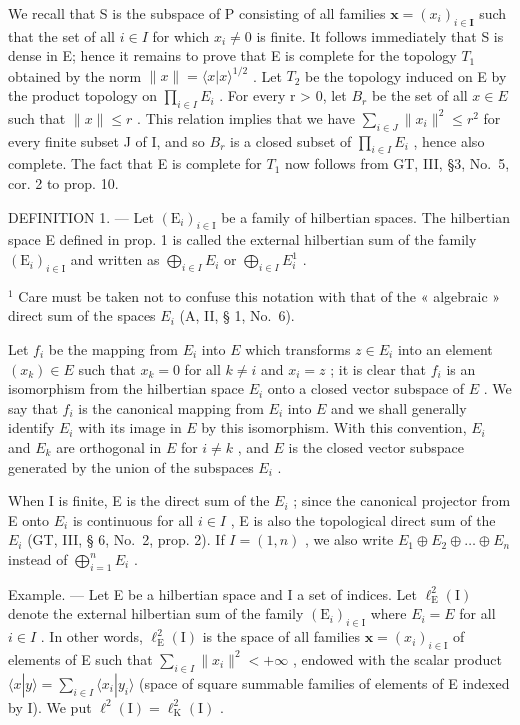 We recall that S is the subspace of P consisting of all families \(\mathbf{x} = (x_{i})_{i \in \mathbf{I}}\) such that the set of all \(i \in I\) for which \(x_{i} \neq 0\) is finite. It follows immediately that S is dense in E; hence it remains to prove that E is complete for the topology \(T_{1}\) obtained by the norm \(\|x\| = \langle x|x\rangle^{1/2}\) . Let \(T_{2}\) be the topology induced on E by the product topology on \(\prod_{i \in I} E_{i}\) . For every r \textgreater{} 0, let \(B_{r}\) be the set of all \(x \in E\) such that \(\|x\| \leqslant r\) . This relation implies that we have \(\sum_{i \in J} \|x_{i}\|^{2} \leqslant r^{2}\) for every finite subset J of I, and so \(B_{r}\) is a closed subset of \(\prod_{i \in I} E_{i}\) , hence also complete. The fact that E is complete for \(T_{1}\) now follows from GT, III, §3, No.~5, cor. 2 to prop. 10.

DEFINITION 1. --- Let \((\mathrm{E}_{i})_{i\in\mathrm{I}}\) be a family of hilbertian spaces. The hilbertian space E defined in prop. 1 is called the external hilbertian sum of the family \((\mathrm{E}_{i})_{i\in\mathrm{I}}\) and written as \(\bigoplus_{i\in I} E_{i}\) or \(\bigoplus_{i\in I} E_{i}^{1}\) .

\(^{1}\) Care must be taken not to confuse this notation with that of the « algebraic » direct sum of the spaces \(E_{i}\) (A, II, § 1, No.~6).

Let \(f_{i}\) be the mapping from \(E_{i}\) into \(E\) which transforms \(z \in E_{i}\) into an element \((x_{k}) \in E\) such that \(x_{k} = 0\) for all \(k \neq i\) and \(x_{i} = z\) ; it is clear that \(f_{i}\) is an isomorphism from the hilbertian space \(E_{i}\) onto a closed vector subspace of \(E\) . We say that \(f_{i}\) is the canonical mapping from \(E_{i}\) into \(E\) and we shall generally identify \(E_{i}\) with its image in \(E\) by this isomorphism. With this convention, \(E_{i}\) and \(E_{k}\) are orthogonal in \(E\) for \(i \neq k\) , and \(E\) is the closed vector subspace generated by the union of the subspaces \(E_{i}\) .

When I is finite, E is the direct sum of the \(E_{i}\) ; since the canonical projector from E onto \(E_{i}\) is continuous for all \(i \in I\) , E is also the topological direct sum of the \(E_{i}\) (GT, III, § 6, No.~2, prop. 2). If \(I = \left(1, n\right)\) , we also write \(E_{1} \oplus E_{2} \oplus \ldots \oplus E_{n}\) instead of \(\bigoplus_{i=1}^{n} E_{i}\) .

Example. --- Let E be a hilbertian space and I a set of indices. Let \(\ell_{\mathrm{E}}^{2}(\mathrm{I})\) denote the external hilbertian sum of the family \((\mathrm{E}_{i})_{i\in\mathrm{I}}\) where \(E_{i}=E\) for all \(i\in I\) . In other words, \(\ell_{\mathrm{E}}^{2}(\mathrm{I})\) is the space of all families \(\mathbf{x}=(x_{i})_{i\in\mathrm{I}}\) of elements of E such that \(\sum_{i\in I}\|x_{i}\|^{2}<+\infty\) , endowed with the scalar product \(\langle x|y\rangle=\sum_{i\in I}\langle x_{i}|y_{i}\rangle\) (space of square summable families of elements of E indexed by I). We put \(\ell^{2}(\mathrm{I})=\ell_{\mathrm{K}}^{2}(\mathrm{I})\) .

